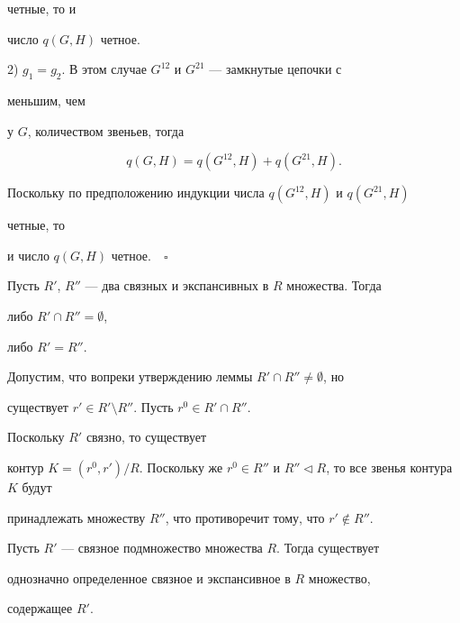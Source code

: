 четные, то и 


число $q(G,H)$ четное. 


 


2) $g_1=g_2$. В этом случае $G^{12}$ и $G^{21}$ --- замкнутые цепочки с 


меньшим, чем 


у $G$, количеством звеньев, тогда 


$$ 


q(G,H)=q(G^{12},H)+q(G^{21},H). 


$$ 


Поскольку по предположению индукции числа $q(G^{12},H)$ и $q(G^{21},H)$ 


четные, то 


и число $q(G,H)$ четное.$\quad\square$ 


 


\begin{lem} 


Пусть $R'$, $R''$ --- два связных и экспансивных в $R$ множества. Тогда 


либо $R'\cap R''=\emptyset$, 


либо $R'=R''$. 


\end{lem} 


 


\begin{pf} 


Допустим, что вопреки утверждению леммы $R'\cap R''\ne\emptyset$, но 


существует $r'\in R'\setminus R''$. Пусть $r^0\in R'\cap R''$. 


Поскольку $R'$ связно, то существует 


контур $K=(r^0,r')/R$. Поскольку же $r^0\in R''$ и $R''\vartriangleleft 


R$, то все звенья контура $K$ будут 


принадлежать множеству $R''$, что противоречит тому, что $r'\notin 


R''$. 


\end{pf} 


 


\begin{lem} 


Пусть $R'$ --- связное подмножество множества $R$. Тогда существует 


однозначно определенное связное и экспансивное в $R$ множество, 


содержащее $R'$. 


\end{lem} 





